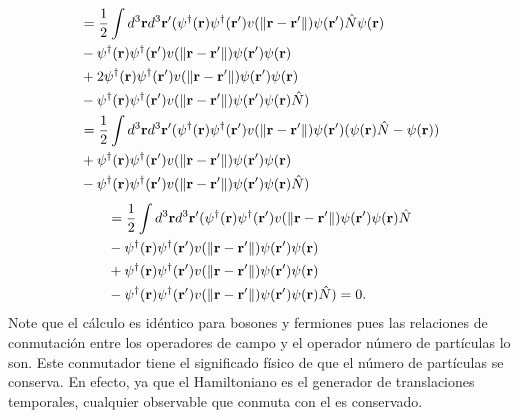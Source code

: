 \documentclass{article}
\begin{document}
\begin{align*}
&=\frac{1}{2}\int d^3\vb{r}d^3\vb{r}'(\psi^\dagger(\vb{r})\psi^\dagger(\vb{r}')v(\|\vb{r}-\vb{r}'\|)\psi(\vb{r}')\hat{N}\psi(\vb{r})\\
&-\psi^\dagger(\vb{r})\psi^\dagger(\vb{r}')v(\|\vb{r}-\vb{r}'\|)\psi(\vb{r}')\psi(\vb{r})\\
&+2\psi^\dagger(\vb{r})\psi^\dagger(\vb{r}')v(\|\vb{r}-\vb{r}'\|)\psi(\vb{r}')\psi(\vb{r})\\
&-\psi^\dagger(\vb{r})\psi^\dagger(\vb{r}')v(\|\vb{r}-\vb{r}'\|)\psi(\vb{r}')\psi(\vb{r})\hat{N})\\
&=\frac{1}{2}\int d^3\vb{r}d^3\vb{r}'(\psi^\dagger(\vb{r})\psi^\dagger(\vb{r}')v(\|\vb{r}-\vb{r}'\|)\psi(\vb{r}')(\psi(\vb{r})\hat{N}-\psi(\vb{r}))\\
&+\psi^\dagger(\vb{r})\psi^\dagger(\vb{r}')v(\|\vb{r}-\vb{r}'\|)\psi(\vb{r}')\psi(\vb{r})\\
&-\psi^\dagger(\vb{r})\psi^\dagger(\vb{r}')v(\|\vb{r}-\vb{r}'\|)\psi(\vb{r}')\psi(\vb{r})\hat{N})
\end{align*}
\begin{align*}
&=\frac{1}{2}\int d^3\vb{r}d^3\vb{r}'(\psi^\dagger(\vb{r})\psi^\dagger(\vb{r}')v(\|\vb{r}-\vb{r}'\|)\psi(\vb{r}')\psi(\vb{r})\hat{N}\\
&-\psi^\dagger(\vb{r})\psi^\dagger(\vb{r}')v(\|\vb{r}-\vb{r}'\|)\psi(\vb{r}')\psi(\vb{r})\\
&+\psi^\dagger(\vb{r})\psi^\dagger(\vb{r}')v(\|\vb{r}-\vb{r}'\|)\psi(\vb{r}')\psi(\vb{r})\\
&-\psi^\dagger(\vb{r})\psi^\dagger(\vb{r}')v(\|\vb{r}-\vb{r}'\|)\psi(\vb{r}')\psi(\vb{r})\hat{N})=0.
\end{align*}
Note que el cálculo es idéntico para bosones y fermiones pues las relaciones de conmutación entre los operadores de campo y el operador número de partículas lo son. Este conmutador tiene el significado físico de que el número de partículas se conserva. En efecto, ya que el Hamiltoniano es el generador de translaciones temporales, cualquier observable que conmuta con el es conservado.
\end{document}
